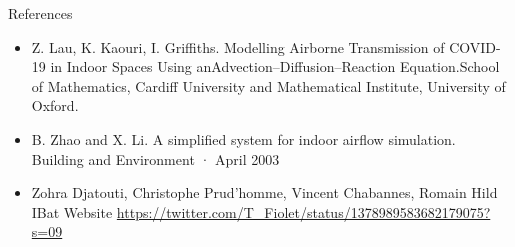 \documentclass[10pt]{beamer}
\begin{document}
\begin{frame}{References }
    \begin{itemize}
        \item Z. Lau, K. Kaouri, I. Griffiths. Modelling Airborne Transmission of COVID-19 in Indoor Spaces Using anAdvection–Diffusion–Reaction Equation.School of Mathematics, Cardiff University and Mathematical Institute, University of Oxford.
        \item B. Zhao and X. Li. A simplified system for indoor airflow simulation. Building and Environment · April 2003
        \item Zohra Djatouti, Christophe Prud’homme, Vincent Chabannes, Romain Hild IBat Website
        \url {https://twitter.com/T_Fiolet/status/1378989583682179075?s=09}        
    \end{itemize}
\end{frame}
\end{document}
